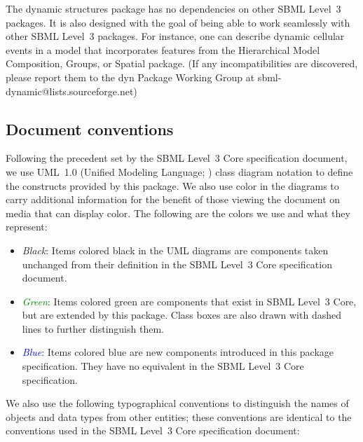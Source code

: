 The dynamic structures package has no dependencies on other SBML Level~3 packages. It is also designed with the goal of being able to work seamlessly with other SBML Level~3 packages. For instance, one can describe dynamic cellular events in a model that incorporates features from the Hierarchical Model Composition, Groups, or Spatial package. (If any incompatibilities are discovered, please report them to the dyn Package Working Group at sbml-dynamic@lists.sourceforge.net)

\subsection{Document conventions}
\label{subsec:conventions}

Following the precedent set by the SBML Level~3 Core specification
document, we use UML~1.0 (Unified Modeling Language;
\citealt{eriksson:1998,oestereich:1999}) class diagram notation to
define the constructs provided by this package.  We also use color in
the diagrams to carry additional information for the benefit of those
viewing the document on media that can display color.  The following are
the colors we use and what they represent:

\begin{itemize}

\item[\raisebox{2.75pt}{\colorbox{black}{\rule{0.8pt}{0.8pt}}}]
  \emph{Black}: Items colored black in the UML diagrams are components
  taken unchanged from their definition in the SBML Level~3 Core
  specification document.

\item[\raisebox{2.75pt}{\colorbox{green}{\rule{0.8pt}{0.8pt}}}]
  \emph{\textcolor{green}{Green}}: Items colored green are
  components that exist in SBML Level~3 Core, but are extended by this
  package.  Class boxes are also drawn with dashed lines to further
  distinguish them.

\item[\raisebox{2.75pt}{\colorbox{blue}{\rule{0.8pt}{0.8pt}}}]
  \emph{\textcolor{blue}{Blue}}: Items colored blue are new
  components introduced in this package specification.  They have no
  equivalent in the SBML Level~3 Core specification.

\end{itemize}

We also use the following typographical conventions to distinguish the
names of objects and data types from other entities; these conventions
are identical to the conventions used in the SBML Level~3 Core specification
document:

